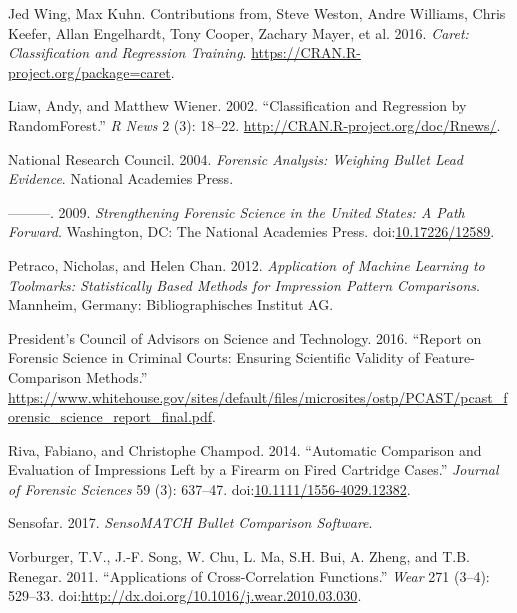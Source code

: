 \documentclass[12pt,]{article}
\theoremstyle{definition}
\theoremstyle{definition}
\theoremstyle{definition}
\theoremstyle{remark}
\begin{document}
\hypertarget{ref-caretpkg}{}
Jed Wing, Max Kuhn. Contributions from, Steve Weston, Andre Williams,
Chris Keefer, Allan Engelhardt, Tony Cooper, Zachary Mayer, et al. 2016.
\emph{Caret: Classification and Regression Training}.
\url{https://CRAN.R-project.org/package=caret}.

\hypertarget{ref-randomForest}{}
Liaw, Andy, and Matthew Wiener. 2002. ``Classification and Regression by
RandomForest.'' \emph{R News} 2 (3): 18--22.
\url{http://CRAN.R-project.org/doc/Rnews/}.

\hypertarget{ref-national2004forensic}{}
National Research Council. 2004. \emph{Forensic Analysis: Weighing
Bullet Lead Evidence}. National Academies Press.

\hypertarget{ref-NAS:2009}{}
---------. 2009. \emph{Strengthening Forensic Science in the United
States: A Path Forward}. Washington, DC: The National Academies Press.
doi:\href{https://doi.org/10.17226/12589}{10.17226/12589}.

\hypertarget{ref-petraco:2012}{}
Petraco, Nicholas, and Helen Chan. 2012. \emph{Application of Machine
Learning to Toolmarks: Statistically Based Methods for Impression
Pattern Comparisons}. Mannheim, Germany: Bibliographisches Institut AG.

\hypertarget{ref-pcast2016}{}
President's Council of Advisors on Science and Technology. 2016.
``Report on Forensic Science in Criminal Courts: Ensuring Scientific
Validity of Feature-Comparison Methods.''
\url{https://www.whitehouse.gov/sites/default/files/microsites/ostp/PCAST/pcast_forensic_science_report_final.pdf}.

\hypertarget{ref-riva:2014}{}
Riva, Fabiano, and Christophe Champod. 2014. ``Automatic Comparison and
Evaluation of Impressions Left by a Firearm on Fired Cartridge Cases.''
\emph{Journal of Forensic Sciences} 59 (3): 637--47.
doi:\href{https://doi.org/10.1111/1556-4029.12382}{10.1111/1556-4029.12382}.

\hypertarget{ref-sensofar}{}
Sensofar. 2017. \emph{SensoMATCH Bullet Comparison Software}.

\hypertarget{ref-vorburger:2011}{}
Vorburger, T.V., J.-F. Song, W. Chu, L. Ma, S.H. Bui, A. Zheng, and T.B.
Renegar. 2011. ``Applications of Cross-Correlation Functions.''
\emph{Wear} 271 (3--4): 529--33.
doi:\href{https://doi.org/http://dx.doi.org/10.1016/j.wear.2010.03.030}{http://dx.doi.org/10.1016/j.wear.2010.03.030}.
\end{document}
